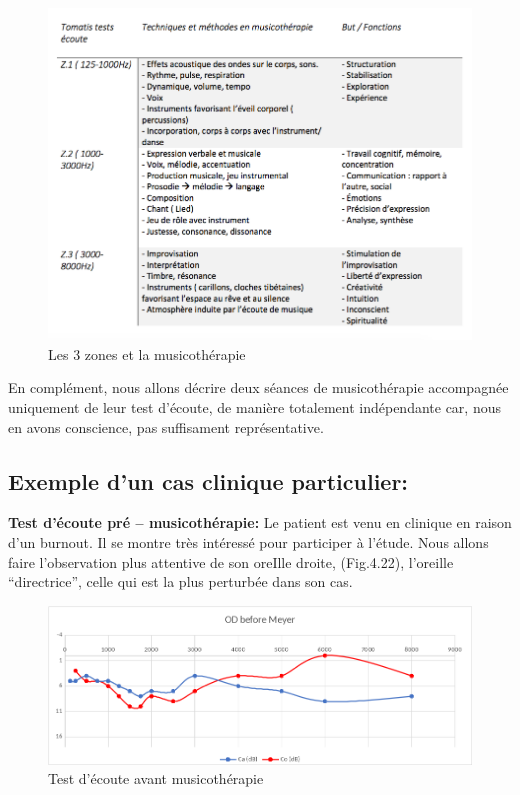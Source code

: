 \begin{figure}[tbh]
	\centering
	\includegraphics[width=1\linewidth]{images/testtechnmethbut}
	\caption[Zones du test avec la musicothérapie]{Les 3 
          zones et la musicothérapie}
       
	\label{testbutetfonction}
\end{figure}

 
   
En complément, nous allons décrire deux séances de
musicothérapie accompagnée uniquement de leur test d'écoute, de
manière totalement indépendante car, nous en avons conscience, pas
suffisament représentative.

\subsection{Exemple d'un cas clinique particulier:}

\textbf{ Test d'écoute pré -- musicothérapie:}
 	Le patient est venu en clinique en raison d'un burnout. Il se montre très
        intéressé pour participer à l'étude. Nous allons faire
        l'observation plus attentive de 
        son oreIlle droite, (Fig.4.22), l'oreille ``directrice'',
        celle qui est la plus perturbée dans son cas.
 
 	
 	\begin{figure}[tbh]
 		\centering
 		\includegraphics[width=0.7\linewidth]{images/clinique/od_before_meyer.png}
 		\caption{Test d'écoute avant musicothérapie}
 		\label{fig:odbeforemeyer}
 	\end{figure}
 	

